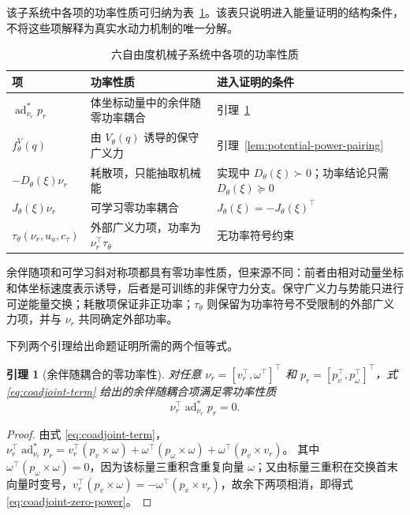 \documentclass[UTF8,zihao=-4]{ctexrep}
\newtheorem{lemma}{引理}[chapter]
\newcommand{\ad}{\operatorname{ad}}
\begin{document}
该子系统中各项的功率性质可归纳为表~\ref{tab:mechanical-core-power-roles}。该表只说明进入能量证明的结构条件，不将这些项解释为真实水动力机制的唯一分解。

\begin{table}[htbp]
  \centering
  \caption{六自由度机械子系统中各项的功率性质}
  \label{tab:mechanical-core-power-roles}
  \begin{tabularx}{\textwidth}{>{\raggedright\arraybackslash}p{}>{\raggedright\arraybackslash}p{}>{\raggedright\arraybackslash}X}
    \toprule
    项 & 功率性质 & 进入证明的条件 \\
    \midrule
    \(\ad_{\nu_r}^{\ast}p_r\) & 体坐标动量中的余伴随零功率耦合 & 引理~\ref{lem:coadjoint-zero-power} \\
    \(f_\theta^V(q)\) & 由 \(V_\theta(q)\) 诱导的保守广义力 & 引理~\ref{lem:potential-power-pairing} \\
    \(-D_\theta(\xi)\nu_r\) & 耗散项，只能抽取机械能 & 实现中 \(D_\theta(\xi)\succ0\)；功率结论只需 \(D_\theta(\xi)\succeq0\) \\
    \(J_\theta(\xi)\nu_r\) & 可学习零功率耦合 & \(J_\theta(\xi)=-J_\theta(\xi)^\top\) \\
    \(\tau_\theta(\nu_r,u_a,c_\tau)\) & 外部广义力项，功率为 \(\nu_r^\top\tau_\theta\) & 无功率符号约束 \\
    \bottomrule
  \end{tabularx}
\end{table}

余伴随项和可学习斜对称项都具有零功率性质，但来源不同：前者由相对动量坐标和体坐标速度表示诱导，后者是可训练的非保守力分支。保守广义力与势能只进行可逆能量交换；耗散项保证非正功率；\(\tau_\theta\) 则保留为功率符号不受限制的外部广义力项，并与 \(\nu_r\) 共同确定外部功率。

下列两个引理给出命题证明所需的两个恒等式。

\begin{lemma}[余伴随耦合的零功率性]
  \label{lem:coadjoint-zero-power}
  对任意 \(\nu_r=[v_r^\top,\omega^\top]^\top\) 和 \(p_r=[p_v^\top,p_\omega^\top]^\top\)，式 \eqref{eq:coadjoint-term} 给出的余伴随耦合项满足零功率性质
  \begin{equation}
    \nu_r^\top\ad_{\nu_r}^{\ast}p_r
    =0 .
    \label{eq:coadjoint-zero-power}
  \end{equation}
\end{lemma}
\begin{proof}
  由式 \eqref{eq:coadjoint-term}，
  \(\nu_r^\top\ad_{\nu_r}^{\ast}p_r
  =v_r^\top(p_v\times\omega)+\omega^\top(p_\omega\times\omega)+\omega^\top(p_v\times v_r)\)。
  其中 \(\omega^\top(p_\omega\times\omega)=0\)，因为该标量三重积含重复向量 \(\omega\)；又由标量三重积在交换首末向量时变号，\(v_r^\top(p_v\times\omega)=-\omega^\top(p_v\times v_r)\)，故余下两项相消，即得式 \eqref{eq:coadjoint-zero-power}。
\end{proof}
\end{document}

